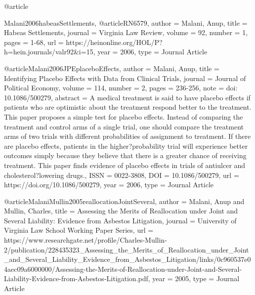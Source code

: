 @article{Malani2006habeasSettlements,
@article{RN6579,
   author = {Malani, Anup},
   title = {Habeas Settlements},
   journal = {Virginia Law Review},
   volume = {92},
   number = {1},
   pages = {1-68},
   url = {https://heinonline.org/HOL/P?h=hein.journals/valr92&i=15},
   year = {2006},
   type = {Journal Article}
}

@article{Malani2006JPEplaceboEffects,
   author = {Malani, Anup},
   title = {Identifying Placebo Effects with Data from Clinical Trials},
   journal = {Journal of Political Economy},
   volume = {114},
   number = {2},
   pages = {236-256},
   note = {doi: 10.1086/500279},
   abstract = {A medical treatment is said to have placebo effects if patients who are optimistic about the treatment respond better to the treatment. This paper proposes a simple test for placebo effects. Instead of comparing the treatment and control arms of a single trial, one should compare the treatment arms of two trials with different probabilities of assignment to treatment. If there are placebo effects, patients in the higher?probability trial will experience better outcomes simply because they believe that there is a greater chance of receiving treatment. This paper finds evidence of placebo effects in trials of antiulcer and cholesterol?lowering drugs.},
   ISSN = {0022-3808},
   DOI = {10.1086/500279},
   url = {https://doi.org/10.1086/500279},
   year = {2006},
   type = {Journal Article}
}




@article{MalaniMullin2005reallocationJointSeveral,
   author = {Malani, Anup and Mullin, Charles},
   title = {Assessing the Merits of Reallocation under Joint and Several Liability: Evidence from Asbestos Litigation},
   journal = {University of Virginia Law School Working Paper Series},
   url = {https://www.researchgate.net/profile/Charles-Mullin-2/publication/228435323_Assessing_the_Merits_of_Reallocation_under_Joint_and_Several_Liability_Evidence_from_Asbestos_Litigation/links/0c960537e04aec09a6000000/Assessing-the-Merits-of-Reallocation-under-Joint-and-Several-Liability-Evidence-from-Asbestos-Litigation.pdf},
   year = {2005},
   type = {Journal Article}
}




}
